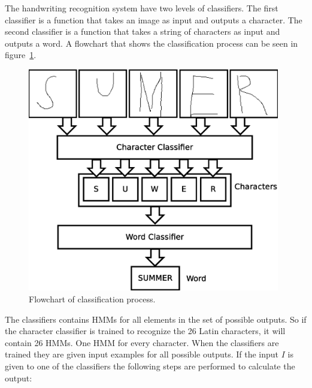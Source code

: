 
The handwriting recognition system have two levels of classifiers. The first classifier is a function that takes an image as input and outputs a character. The second classifier is a function that takes a string of characters as input and outputs a word. A flowchart that shows the classification process can be seen in figure~\ref{fig:classification_system_overview}. 

    \begin{figure}[htb] 
      \begin{center}
	\leavevmode
	\includegraphics[width=110mm]{classification_system_overview.eps}%
      \end{center}
      \caption{Flowchart of classification process.}
      \label{fig:classification_system_overview}
    \end{figure}

The classifiers contains HMMs for all elements in the set of possible outputs. So if the character classifier is trained to recognize the 26 Latin characters, it will contain 26 HMMs. One HMM for every character. When the classifiers are trained they are given input examples for all possible outputs. If the input $I$ is given to one of the classifiers the following steps are performed to calculate the output:


